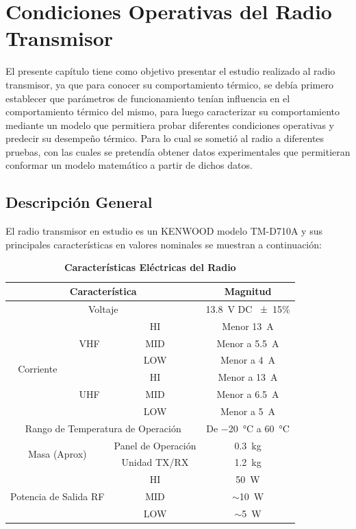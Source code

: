\chapter{Condiciones Operativas del Radio Transmisor}

El presente capítulo tiene como objetivo presentar el estudio realizado al radio transmisor, ya que para conocer su comportamiento térmico, se debía primero establecer que parámetros de funcionamiento tenían influencia en el comportamiento térmico del mismo, para luego caracterizar su comportamiento mediante un modelo que permitiera probar diferentes condiciones operativas y predecir su desempeño térmico. Para lo cual se sometió al radio a diferentes pruebas, con las cuales se pretendía obtener datos experimentales que permitieran conformar un modelo matemático a partir de dichos datos.

\section{Descripción General}

El radio transmisor en estudio es un KENWOOD modelo TM-D710A y sus principales características en valores nominales se muestran a continuación:\cite{manual}

\begin{table}[H]
    \centering
    \caption{\textbf{Características Eléctricas del Radio}}
    \begin{tabular}{cccc}
    \toprule
    \multicolumn{3}{c}{\textbf{Característica}} & \textbf{Magnitud}  \\
    \midrule
    \multicolumn{3}{c}{Voltaje} & \SI{13,8}{\volt} DC \num{\pm 15}\si{\percent} \\
    \midrule
    \multirow{6}{*}{Corriente} & \multirow{3}{*}{VHF} &  HI & Menor \SI{13}{\ampere} \\ && MID & Menor a \SI{5,5}{\ampere} \\ && LOW & Menor a \SI{4}{\ampere}\\
    & \multirow{3}{*}{UHF} &  HI & Menor a \SI{13}{\ampere}\\ && MID & Menor a \SI{6,5}{\ampere} \\ && LOW & Menor a \SI{5}{\ampere} \\
    \midrule
    \multicolumn{3}{c}{Rango de Temperatura de Operación} & De \SI{-20}{\celsius} a \SI{60}{\celsius}
    \\
    \midrule
    \multicolumn{2}{c}{\multirow{2}{*}{Masa (Aprox)}} & Panel de Operación & \SI{0,3}{\kilogram}\\
    && Unidad TX/RX & \SI{1,2}{\kilogram}\\
    \midrule
    \multicolumn{2}{c}{\multirow{3}{*}{Potencia de Salida RF}} & HI & \SI{50}{\watt}\\
    &&  MID & $\sim$\SI{10}{\watt} \\ && LOW & $\sim$\SI{5}{\watt} \\
    \bottomrule
    \end{tabular}
    \label{tab:1}
\end{table}

